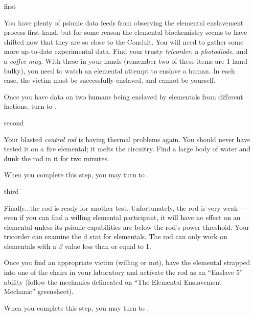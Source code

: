 \documentclass[notebook]{elementals}
\begin{document}

\startnotebook{\nEnslavementResearch{}}

\begin{page}{first}

You have plenty of psionic data feeds from observing the elemental enslavement process first-hand, but for some reason the elemental biochemistry seems to have shifted now that they are so close to the Conduit. You will need to gather	 some more up-to-date experimental data. Find your trusty \emph{tricorder}, a \emph{photodiode}, and a \emph{coffee mug}. With these in your hands (remember two of these items are 1-hand bulky), you need to watch an elemental attempt to enslave a human. In each case, the victim must be successfully enslaved, and cannot be yourself.

Once you have data on two humans being enslaved by elementals from different factions, turn to .

\end{page}

\begin{page}{second}

Your blasted \emph{control rod} is having thermal problems again. You should never have tested it on a fire elemental; it melts the circuitry. Find a large body of water and dunk the rod in it for two minutes.

When you complete this step, you may turn to .

\end{page}

\begin{page}{third}

Finally...the rod is ready for another test. Unfortunately, the rod is very weak --- even if you can find a willing elemental participant, it will have no effect on an elemental unless its psionic capabilities are below the rod's power threshold. Your tricorder can examine the $\beta$ stat for elementals. The rod can only work on elementals with a $\beta$ value less than or equal to 1.

Once you find an appropriate victim (willing or not), have the elemental strapped into one of the chairs in your laboratory and activate the rod as an ``Enslave 5'' ability (follow the mechanics delineated on ``The Elemental Enslavement Mechanic'' greensheet).

When you complete this step, you may turn to .

\end{page}
\end{document}
